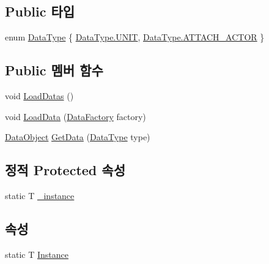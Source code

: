 \subsection*{Public 타입}
\begin{DoxyCompactItemize}
\item 
enum \hyperlink{class_data_manager_ac9cb5bf021d3ebcc7f3eaa4bf5393408}{Data\+Type} \{ \hyperlink{class_data_manager_ac9cb5bf021d3ebcc7f3eaa4bf5393408aec8fc2c42b9c76effd648a14b311411f}{Data\+Type.\+U\+N\+IT}, 
\hyperlink{class_data_manager_ac9cb5bf021d3ebcc7f3eaa4bf5393408a7c6e2cf513b9dd1e325a44c62b4db182}{Data\+Type.\+A\+T\+T\+A\+C\+H\+\_\+\+A\+C\+T\+OR}
 \}
\end{DoxyCompactItemize}
\subsection*{Public 멤버 함수}
\begin{DoxyCompactItemize}
\item 
void \hyperlink{class_data_manager_a00011c93858e3f4ff45ee740b62a6035}{Load\+Datas} ()
\item 
void \hyperlink{class_data_manager_a458b89dc0fc8d8f2e744ec90e5c43a89}{Load\+Data} (\hyperlink{class_data_factory}{Data\+Factory} factory)
\item 
\hyperlink{class_data_object}{Data\+Object} \hyperlink{class_data_manager_ae2b53c25ded2918f2f0aa62ca0a6cee9}{Get\+Data} (\hyperlink{class_data_manager_ac9cb5bf021d3ebcc7f3eaa4bf5393408}{Data\+Type} type)
\end{DoxyCompactItemize}
\subsection*{정적 Protected 속성}
\begin{DoxyCompactItemize}
\item 
static T \hyperlink{class_f_z_1_1_singletone_a1da3d44c1904d88e6fc0252c9333c221}{\+\_\+instance}
\end{DoxyCompactItemize}
\subsection*{속성}
\begin{DoxyCompactItemize}
\item 
static T \hyperlink{class_f_z_1_1_singletone_a8e7ba3cf5cff48b1101428beefcd76b4}{Instance}
\end{DoxyCompactItemize}
